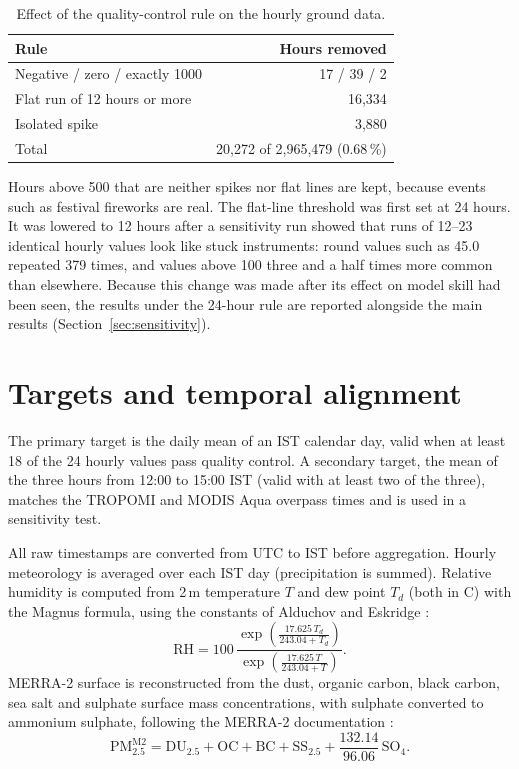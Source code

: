 \begin{table}[!htbp]
    \centering
    \small
    \begin{tabular}{l|r}
        \hline
        Rule & Hours removed \\
        \hline
        Negative / zero / exactly 1000\ugm{} & 17 / 39 / 2 \\
        Flat run of 12 hours or more & 16,334 \\
        Isolated spike & 3,880 \\
        \hline
        Total & 20,272 of 2,965,479 (0.68\,\%) \\
        \hline
    \end{tabular}
    \caption{Effect of the quality-control rule on the hourly ground data.}
    \label{tab:qc}
\end{table}

Hours above 500\ugm{} that are neither spikes nor flat lines are kept, because events such as
festival fireworks are real. The flat-line threshold was first set at 24 hours. It was lowered to
12 hours after a sensitivity run showed that runs of 12--23 identical hourly values look like stuck
instruments: round values such as 45.0 repeated 379 times, and values above 100\ugm{} three and a
half times more common than elsewhere. Because this change was made after its effect on model
skill had been seen, the results under the 24-hour rule are reported alongside the main results
(Section~\ref{sec:sensitivity}).

\section{Targets and temporal alignment}\label{sec:align}

The primary target is the daily mean \pmtf{} of an IST calendar day, valid when at least 18 of the
24 hourly values pass quality control. A secondary target, the mean of the three hours from 12:00
to 15:00 IST (valid with at least two of the three), matches the TROPOMI and MODIS Aqua overpass
times and is used in a sensitivity test.

All raw timestamps are converted from UTC to IST before aggregation. Hourly meteorology is averaged
over each IST day (precipitation is summed). Relative humidity is computed from 2\,m temperature $T$
and dew point $T_d$ (both in \textdegree C) with the Magnus formula, using the constants of
Alduchov and Eskridge \cite{alduchov1996magnus}:
\begin{equation}\label{eq:rh}
\mathrm{RH} = 100\,\frac{\exp\!\left(\frac{17.625\,T_d}{243.04 + T_d}\right)}{\exp\!\left(\frac{17.625\,T}{243.04 + T}\right)}.
\end{equation}
MERRA-2 surface \pmtf{} is reconstructed from the dust, organic carbon, black carbon, sea salt and
sulphate surface mass concentrations, with sulphate converted to ammonium sulphate, following the
MERRA-2 documentation \cite{gmao2026merra2faq}:
\begin{equation}\label{eq:merra2}
\mathrm{PM}_{2.5}^{\mathrm{M2}} = \mathrm{DU}_{2.5} + \mathrm{OC} + \mathrm{BC} + \mathrm{SS}_{2.5} + \frac{132.14}{96.06}\,\mathrm{SO_4}.
\end{equation}

